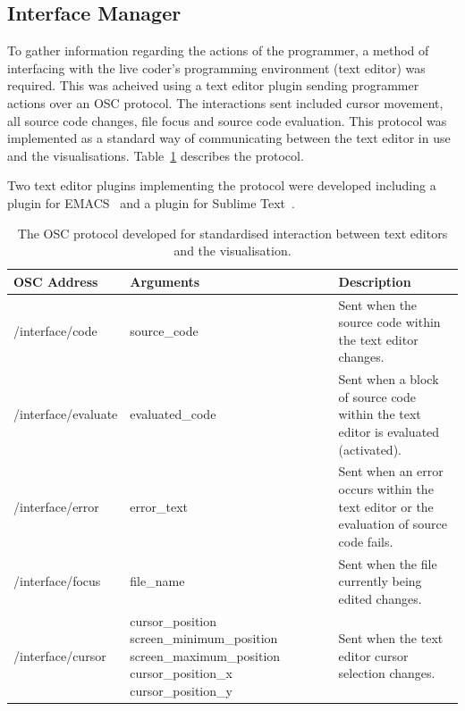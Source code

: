 \subsection{Interface Manager}
\label{sec:interface-manager}

To gather information regarding the actions of the programmer, a method of interfacing with the live coder's programming environment (text editor) was required. This was acheived using a text editor plugin sending programmer actions over an \ac{OSC} protocol. The interactions sent included cursor movement, all source code changes, file focus and source code evaluation. This protocol was implemented as a standard way of communicating between the text editor in use and the visualisations. Table~\ref{table:osc-protocol} describes the protocol.

Two text editor plugins implementing the protocol were developed including a plugin for EMACS~\cite{Stallman1981} and a plugin for Sublime Text~\cite{Skinner2013}.

\begin{table}
  \centering
  \begin{tabular}{|l|p{4.75cm}|p{4.75cm}|}
  \hline
  \textbf{OSC Address} & \textbf{Arguments} & \textbf{Description}\\
  \hline
	/interface/code & source\_code & Sent when the source code within the text editor changes.\\
	\hline
	/interface/evaluate & evaluated\_code & Sent when a block of source code within the text editor is evaluated (activated). \\
	\hline
	/interface/error & error\_text & Sent when an error occurs within the text editor or the evaluation of source code fails.\\
	\hline
	/interface/focus & file\_name & Sent when the file currently being edited changes.\\
	\hline
	/interface/cursor & cursor\_position \newline screen\_minimum\_position \newline screen\_maximum\_position \newline cursor\_position\_x \newline cursor\_position\_y & Sent when the text editor cursor selection changes. \\
  \hline
  \end{tabular}
  \caption{The OSC protocol developed for standardised interaction between text editors and the visualisation.}
  \label{table:osc-protocol}
\end{table}


